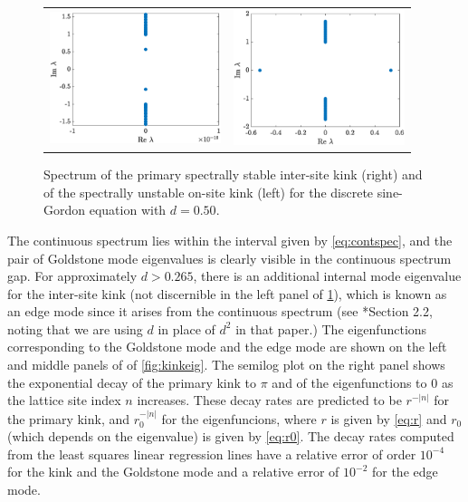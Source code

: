 \documentclass[12pt,reqno]{amsart}
\begin{document}
\begin{figure}
\begin{center}
\begin{tabular}{cc}
\includegraphics[width=5cm]{1kinkspectrum.eps}	&
\includegraphics[width=5cm]{1kinkonsitespectrum.eps}
\end{tabular}
\end{center}
\caption{Spectrum of the primary spectrally stable 
inter-site kink (right) and of the spectrally unstable 
on-site kink (left) for the discrete sine-Gordon equation with $d = 0.50$.}
\label{fig:kinkspec}
\end{figure}

The continuous spectrum lies within the interval given by \cref{eq:contspec}, and the pair of Goldstone mode eigenvalues is clearly visible in the continuous spectrum gap. For approximately $d > 0.265$, there is an additional internal mode eigenvalue for the inter-site kink (not discernible in the left panel of \cref{fig:kinkspec}), which is known as an edge mode since it arises from the continuous spectrum (see \cite{KevrekidisWeinstein2000}*{Section 2.2}, noting that we are using $d$ in place of $d^2$ in that paper.) The eigenfunctions corresponding to the Goldstone mode and the edge mode are shown on the left and middle panels of of \cref{fig:kinkeig}. The semilog plot on the right panel shows the exponential decay of the primary kink to $\pi$ and of the eigenfunctions to 0 as the lattice site index $n$ increases. These decay rates are predicted to be $r^{-|n|}$ for the primary kink, and $r_0^{-|n|}$ for the eigenfuncions, where $r$ is given by \cref{eq:r} and $r_0$ (which depends on the eigenvalue) is given by \cref{eq:r0}. The decay rates computed from the least squares linear regression lines have a relative error of order $10^{-4}$ for the kink and the Goldstone mode and a relative error of $10^{-2}$ for the edge mode.
\end{document}
